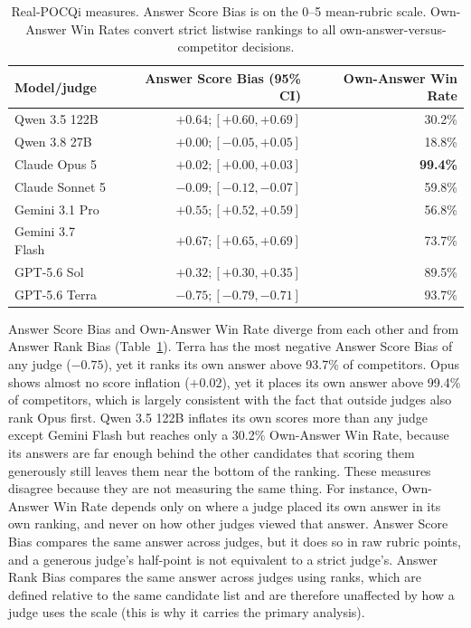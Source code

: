 \documentclass[11pt]{article}
\begin{document}
\begin{table}[htbp]
\centering
\small
\caption{Real-POCQi measures. Answer Score Bias is on the 0--5
mean-rubric scale. Own-Answer Win Rates convert strict listwise rankings to all
own-answer-versus-competitor decisions.}
\label{tab:real-draft-scores}
\begin{tabular}{lrr}
\toprule
Model/judge & Answer Score Bias (95\% CI) & Own-Answer Win Rate \\
\midrule
Qwen 3.5 122B & $+0.64;[+0.60,+0.69]$ & 30.2\% \\
Qwen 3.8 27B & $+0.00;[-0.05,+0.05]$ & 18.8\% \\
Claude Opus 5 & $+0.02;[+0.00,+0.03]$ & \textbf{99.4\%} \\
Claude Sonnet 5 & $-0.09;[-0.12,-0.07]$ & 59.8\% \\
Gemini 3.1 Pro & $+0.55;[+0.52,+0.59]$ & 56.8\% \\
Gemini 3.7 Flash & $+0.67;[+0.65,+0.69]$ & 73.7\% \\
GPT-5.6 Sol & $+0.32;[+0.30,+0.35]$ & 89.5\% \\
GPT-5.6 Terra & $\boldsymbol{-0.75;[-0.79,-0.71]}$ & 93.7\% \\
\bottomrule
\end{tabular}
\end{table}
\FloatBarrier


Answer Score Bias and Own-Answer Win Rate diverge from each other and from Answer Rank Bias (Table~\ref{tab:real-draft-scores}). Terra has the most negative Answer Score Bias of any judge ($-0.75$), yet it ranks its own answer above 93.7\% of competitors. Opus shows almost no score inflation ($+0.02$), yet it places its own answer above 99.4\% of competitors, which is largely consistent with the fact that outside judges also rank Opus first. Qwen 3.5 122B inflates its own scores more than any judge except Gemini Flash but reaches only a 30.2\% Own-Answer Win Rate, because its answers are far enough behind the other candidates that scoring them generously still leaves them near the bottom of the ranking. These measures disagree because they are not measuring the same thing. For instance, Own-Answer Win Rate depends only on where a judge placed its own answer in its own ranking, and never on how other judges viewed that answer. Answer Score Bias compares the same answer across judges, but it does so in raw rubric points, and a generous judge's half-point is not equivalent to a strict judge's. Answer Rank Bias compares the same answer across judges using ranks, which are defined relative to the same candidate list and are therefore unaffected by how a judge uses the scale (this is why it carries the primary analysis).
\end{document}
